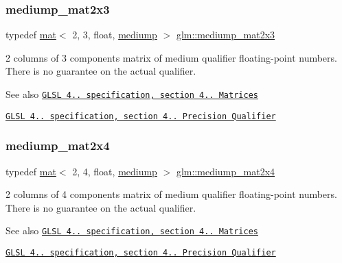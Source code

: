 \subsubsection{\texorpdfstring{mediump\+\_\+mat2x3}{mediump\_mat2x3}}
{\footnotesize\ttfamily typedef \mbox{\hyperlink{structglm_1_1mat}{mat}}$<$ 2, 3, float, \mbox{\hyperlink{namespaceglm_a36ed105b07c7746804d7fdc7cc90ff25a6416f3ea0c9025fb21ed50c4d6620482}{mediump}} $>$ \mbox{\hyperlink{group__core__precision_gae5003c3cea9aa152bf452223b7fd0fd5}{glm\+::mediump\+\_\+mat2x3}}}

2 columns of 3 components matrix of medium qualifier floating-\/point numbers. There is no guarantee on the actual qualifier.

\begin{DoxySeeAlso}{See also}
\href{http://www.opengl.org/registry/doc/GLSLangSpec.4.20.8.pdf}{\tt G\+L\+SL 4.. specification, section 4.. Matrices} 

\href{http://www.opengl.org/registry/doc/GLSLangSpec.4.20.8.pdf}{\tt G\+L\+SL 4.. specification, section 4.. Precision Qualifier} 
\end{DoxySeeAlso}
\mbox{\label{group__core__precision_ga9778942a37cd364cc4129cbf423df429}} 
\subsubsection{\texorpdfstring{mediump\+\_\+mat2x4}{mediump\_mat2x4}}
{\footnotesize\ttfamily typedef \mbox{\hyperlink{structglm_1_1mat}{mat}}$<$ 2, 4, float, \mbox{\hyperlink{namespaceglm_a36ed105b07c7746804d7fdc7cc90ff25a6416f3ea0c9025fb21ed50c4d6620482}{mediump}} $>$ \mbox{\hyperlink{group__core__precision_ga9778942a37cd364cc4129cbf423df429}{glm\+::mediump\+\_\+mat2x4}}}

2 columns of 4 components matrix of medium qualifier floating-\/point numbers. There is no guarantee on the actual qualifier.

\begin{DoxySeeAlso}{See also}
\href{http://www.opengl.org/registry/doc/GLSLangSpec.4.20.8.pdf}{\tt G\+L\+SL 4.. specification, section 4.. Matrices} 

\href{http://www.opengl.org/registry/doc/GLSLangSpec.4.20.8.pdf}{\tt G\+L\+SL 4.. specification, section 4.. Precision Qualifier} 
\end{DoxySeeAlso}
\mbox{\label{group__core__precision_ga718616ee458f17e2525641b94975c184}} 
